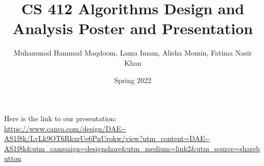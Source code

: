 \documentclass[a4paper]{beamer}
\title{CS 412 Algorithms Design and Analysis Poster and Presentation}
\author{Muhammad Hammad Maqdoom, Lama Imam, Alisha Momin, Fatima Nasir Khan}
\date{Spring 2022}
\begin{document}
\maketitle

Here is the link to our presentation:\\
\url{https://www.canva.com/design/DAE--AS1f8k/LvLk9OT6RkxrUe6PnUrokw/view?utm_content=DAE--AS1f8k&utm_campaign=designshare&utm_medium=link2&utm_source=sharebutton}
\end{document}
